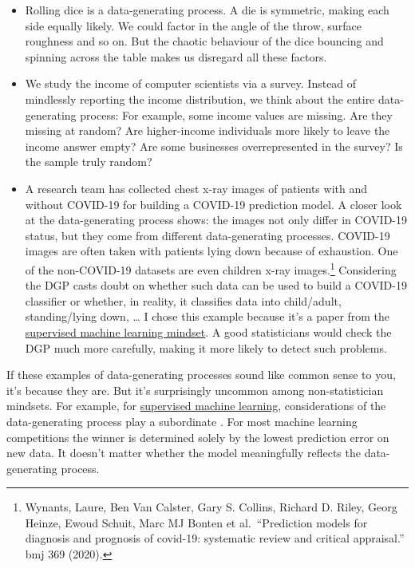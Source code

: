 \documentclass[
  10pt,
]{scrbook}
\providecommand{\tightlist}{%
  \setlength{\itemsep}{0pt}\setlength{\parskip}{0pt}}
\begin{document}
\begin{itemize}
\tightlist
\item
  Rolling dice is a data-generating process. A die is symmetric, making each side equally likely. We could factor in the angle of the throw, surface roughness and so on. But the chaotic behaviour of the dice bouncing and spinning across the table makes us disregard all these factors.
\item
  We study the income of computer scientists via a survey. Instead of mindlessly reporting the income distribution, we think about the entire data-generating process: For example, some income values are missing. Are they missing at random? Are higher-income individuals more likely to leave the income answer empty? Are some businesses overrepresented in the survey? Is the sample truly random?
\item
  A research team has collected chest x-ray images of patients with and without COVID-19 for building a COVID-19 prediction model. A closer look at the data-generating process shows: the images not only differ in COVID-19 status, but they come from different data-generating processes. COVID-19 images are often taken with patients lying down because of exhaustion. One of the non-COVID-19 datasets are even children x-ray images.\footnote{Wynants, Laure, Ben Van Calster, Gary S. Collins, Richard D. Riley, Georg Heinze, Ewoud Schuit, Marc MJ Bonten et al.~``Prediction models for diagnosis and prognosis of covid-19: systematic review and critical appraisal.'' bmj 369 (2020).} Considering the DGP casts doubt on whether such data can be used to build a COVID-19 classifier or whether, in reality, it classifies data into child/adult, standing/lying down, \ldots{} I chose this example because it's a paper from the \protect\hyperlink{supervised-ml}{supervised machine learning mindset}. A good statisticians would check the DGP much more carefully, making it more likely to detect such problems.
\end{itemize}

If these examples of data-generating processes sound like common sense to you, it's because they are.
But it's surprisingly uncommon among non-statistician mindsets.
For example, for \protect\hyperlink{supervised-ml}{supervised machine learning}, considerations of the data-generating process play a subordinate .
For most machine learning competitions the winner is determined solely by the lowest prediction error on new data.
It doesn't matter whether the model meaningfully reflects the data-generating process.
\end{document}
